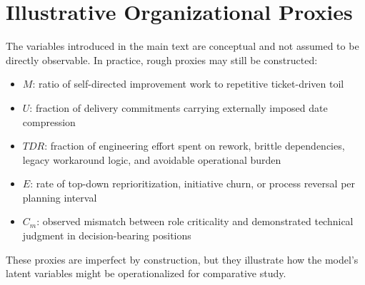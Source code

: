 \documentclass[letterpaper]{article}
\begin{document}
\appendix
\section{Illustrative Organizational Proxies}

The variables introduced in the main text are conceptual and not assumed to be directly observable. In practice, rough proxies may still be constructed:

\begin{itemize}
    \item $M$: ratio of self-directed improvement work to repetitive ticket-driven toil
    \item $U$: fraction of delivery commitments carrying externally imposed date compression
    \item $TDR$: fraction of engineering effort spent on rework, brittle dependencies, legacy workaround logic, and avoidable operational burden
    \item $E$: rate of top-down reprioritization, initiative churn, or process reversal per planning interval
    \item $C_m$: observed mismatch between role criticality and demonstrated technical judgment in decision-bearing positions
\end{itemize}

These proxies are imperfect by construction, but they illustrate how the model's latent variables might be operationalized for comparative study.


\printbibliography
\end{document}
